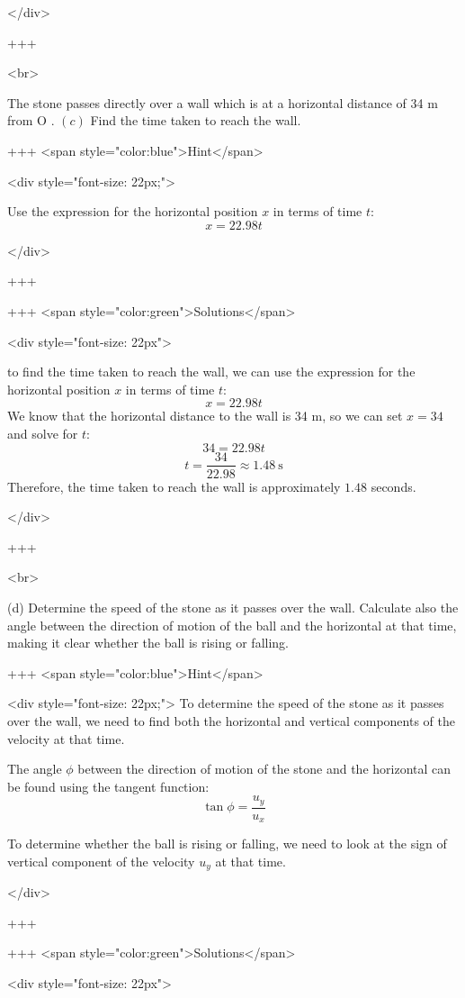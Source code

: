 </div>

+++

<br>

The stone passes directly over a wall which is at a horizontal distance of 34 m from O .
\((c)\) Find the time taken to reach the wall.

+++ <span style="color:blue">Hint</span>

<div style="font-size: 22px;">

Use the expression for the horizontal position $x$ in terms of time $t$:
$$ x = 22.98t $$

</div>

+++

+++ <span style="color:green">Solutions</span>

<div style="font-size: 22px">

to find the time taken to reach the wall, we can use the expression for the horizontal position $x$ in terms of time $t$:
$$ x = 22.98t $$
We know that the horizontal distance to the wall is 34 m, so we can set $x = 34$ and solve for $t$:
$$ 34 = 22.98t $$
$$ t = \frac{34}{22.98} \approx 1.48 \mathrm{~s} $$
Therefore, the time taken to reach the wall is approximately $1.48$ seconds.

</div>

+++

<br>

(d) Determine the speed of the stone as it passes over the wall. Calculate also the angle between the direction of motion of the ball and the horizontal at that time, making it clear whether the ball is rising or falling.

+++ <span style="color:blue">Hint</span>

<div style="font-size: 22px;">
To determine the speed of the stone as it passes over the wall, we need to find both the horizontal and vertical components of the velocity at that time.

The angle $\phi$ between the direction of motion of the stone and the horizontal can be found using the tangent function:
$$ \tan \phi = \frac{u_y}{u_x} $$

To determine whether the ball is rising or falling, we need to look at the sign of vertical component of the velocity $u_y$ at that time.

</div>

+++

+++ <span style="color:green">Solutions</span>

<div style="font-size: 22px">

